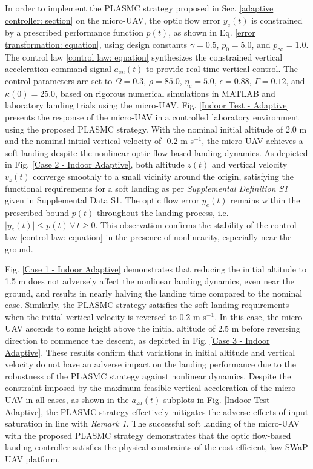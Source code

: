 \documentclass{IEEEtaes}
\begin{document}
In order to implement the PLASMC strategy proposed in Sec. \ref{adaptive controller: section} on the micro-UAV, the optic flow error $y_e(t)$ is constrained by a prescribed performance function $p(t)$, as shown in Eq. \eqref{error transformation: equation}, using design constants $\gamma = 0.5$, $p_0 = 5.0$, and $p_{\infty} = 1.0$.
The control law \eqref{control law: equation} synthesizes the constrained vertical acceleration command signal $a_{zu}(t)$ to provide real-time vertical control.
The control parameters are set to $\Omega = 0.3$, $\rho = 85.0$, $\eta_{\text{c}} = 5.0$, $\epsilon = 0.88$, $\Gamma = 0.12$, and $\kappa(0) = 25.0$, based on rigorous numerical simulations in MATLAB and laboratory landing trials using the micro-UAV.
Fig. \ref{Indoor Test - Adaptive} presents the response of the micro-UAV in a controlled laboratory environment using the proposed PLASMC strategy.
With the nominal initial altitude of 2.0 m and the nominal initial vertical velocity of -0.2 m s$^{-1}$, the micro-UAV achieves a soft landing despite the nonlinear optic flow-based landing dynamics.
As depicted in Fig. \ref{Case 2 - Indoor Adaptive}, both altitude $z(t)$ and vertical velocity $v_z(t)$ converge smoothly to a small vicinity around the origin, satisfying the functional requirements for a soft landing as per \textit{Supplemental Definition S1} given in Supplemental Data S1.
The optic flow error $y_e(t)$ remains within the prescribed bound $p(t)$ throughout the landing process, i.e. $\lvert y_e(t) \rvert\leq p(t) \, \forall \, t \geq 0$.
This observation confirms the stability of the control law \eqref{control law: equation} in the presence of nonlinearity, especially near the ground.

Fig. \ref{Case 1 - Indoor Adaptive} demonstrates that reducing the initial altitude to 1.5 m does not adversely affect the nonlinear landing dynamics, even near the ground, and results in nearly halving the landing time compared to the nominal case.
Similarly, the PLASMC strategy satisfies the soft landing requirements when the initial vertical velocity is reversed to 0.2 m s$^{-1}$.
In this case, the micro-UAV ascends to some height above the initial altitude of 2.5 m before reversing direction to commence the descent, as depicted in Fig. \ref{Case 3 - Indoor Adaptive}.
These results confirm that variations in initial altitude and vertical velocity do not have an adverse impact on the landing performance due to the robustness of the PLASMC strategy against nonlinear dynamics.
Despite the constraint imposed by the maximum feasible vertical acceleration of the micro-UAV in all cases, as shown in the $a_{zu}(t)$ subplots in Fig. \ref{Indoor Test - Adaptive}, the PLASMC strategy effectively mitigates the adverse effects of input saturation in line with \textit{Remark 1}.
The successful soft landing of the micro-UAV with the proposed PLASMC strategy demonstrates that the optic flow-based landing controller satisfies the physical constraints of the cost-efficient, low-SWaP UAV platform.
\end{document}
